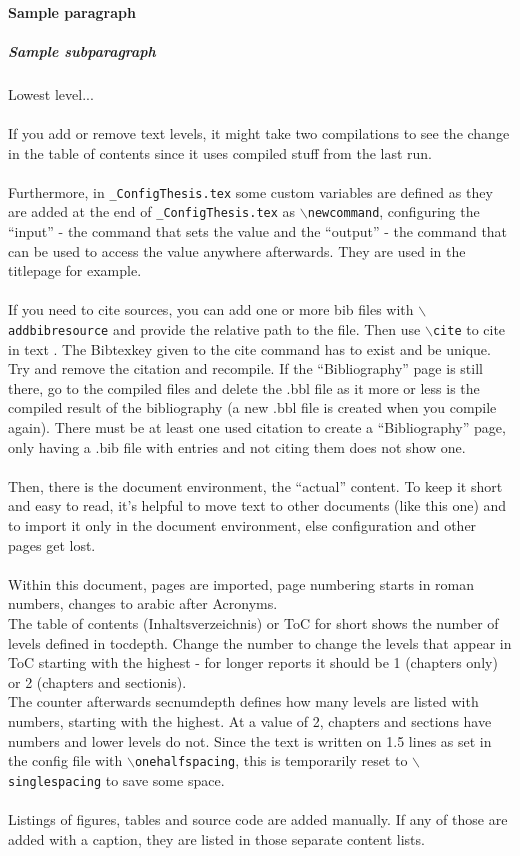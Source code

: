 \paragraph{Sample paragraph}
\subparagraph{Sample subparagraph}
Lowest level...
\\
\\ If you add or remove text levels, it might take two compilations to see the change in the table of contents since it uses compiled stuff from the last run.
\\
\\ Furthermore, in \texttt{\_ConfigThesis.tex} some custom variables are defined as they are added at the end of \texttt{\_ConfigThesis.tex} as \texttt{$\backslash$newcommand}, configuring the ``input'' - the command that sets the value and the ``output'' - the command that can be used to access the value anywhere afterwards. They are used in the titlepage for example.
\\
\\ If you need to cite sources, you can add one or more bib files with \texttt{$\backslash$addbibresource} and provide the relative path to the file. Then use \texttt{$\backslash$cite} to cite in text 
\cite{Mustermann2020}. 
The Bibtexkey given to the cite command has to exist and be unique.
\\ Try and remove the citation and recompile. If the ``Bibliography'' page is still there, go to the compiled files and delete the .bbl file as it more or less is the compiled result of the bibliography (a new .bbl file is created when you compile again). There must be at least one used citation to create a ``Bibliography'' page, only having a .bib file with entries and not citing them does not show one.
\\
\\ Then, there is the document environment, the ``actual'' content. To keep it short and easy to read, it's helpful to move text to other documents (like this one) and to import it only in the document environment, else configuration and other pages get lost.
\\
\\ Within this document, pages are imported, page numbering starts in roman numbers, changes to arabic after Acronyms.
\\ The table of contents (Inhaltsverzeichnis) or ToC for short shows the number of levels defined in tocdepth. Change the number to change the levels that appear in ToC starting with the highest - for longer reports it should be 1 (chapters only) or 2 (chapters and sectionis). 
\\ The counter afterwards secnumdepth defines how many levels are listed with numbers, starting with the highest. At a value of 2, chapters and sections have numbers and lower levels do not. Since the text is written on 1.5 lines as set in the config file with \texttt{$\backslash$onehalfspacing}, this is temporarily reset to \texttt{$\backslash$singlespacing} to save some space.
\\
\\ Listings of figures, tables and source code are added manually. If any of those are added with a caption, they are listed in those separate content lists.
%
